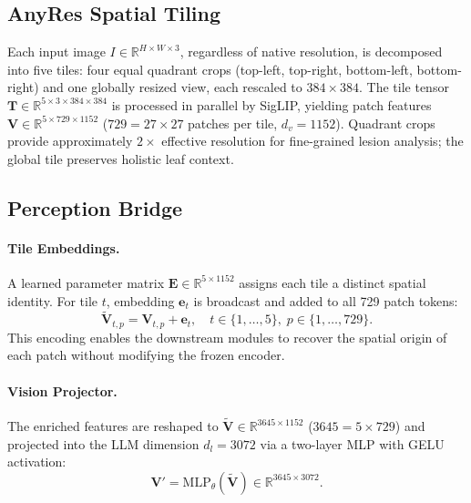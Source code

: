 \documentclass{article}
\begin{document}
\subsection{AnyRes Spatial Tiling}

Each input image $I \in \mathbb{R}^{H \times W \times 3}$, regardless
of native resolution, is decomposed into five tiles: four equal quadrant
crops (top-left, top-right, bottom-left, bottom-right) and one globally
resized view, each rescaled to $384 \times 384$.
The tile tensor $\mathbf{T} \in \mathbb{R}^{5 \times 3 \times 384 \times
384}$ is processed in parallel by SigLIP, yielding patch features
$\mathbf{V} \in \mathbb{R}^{5 \times 729 \times 1152}$
($729 = 27 {\times} 27$ patches per tile, $d_v = 1152$).
Quadrant crops provide approximately $2\times$ effective resolution for
fine-grained lesion analysis; the global tile preserves holistic leaf
context.

\subsection{Perception Bridge}

\paragraph{Tile Embeddings.}
A learned parameter matrix $\mathbf{E} \in \mathbb{R}^{5 \times 1152}$
assigns each tile a distinct spatial identity.
For tile $t$, embedding $\mathbf{e}_t$ is broadcast and added to all 729
patch tokens:
\begin{equation}
  \widetilde{\mathbf{V}}_{t,p} = \mathbf{V}_{t,p} + \mathbf{e}_t,
  \quad t \in \{1,\ldots,5\},\; p \in \{1,\ldots,729\}.
  \label{eq:tile_embed}
\end{equation}
This encoding enables the downstream modules to recover the spatial
origin of each patch without modifying the frozen encoder.

\paragraph{Vision Projector.}
The enriched features are reshaped to
$\widetilde{\mathbf{V}} \in \mathbb{R}^{3645 \times 1152}$
($3645 = 5 \times 729$) and projected into the LLM dimension $d_l =
3072$ via a two-layer MLP with GELU activation:
\begin{equation}
  \mathbf{V}' = \mathrm{MLP}_\theta(\widetilde{\mathbf{V}})
  \in \mathbb{R}^{3645 \times 3072}.
  \label{eq:projector}
\end{equation}
\end{document}
